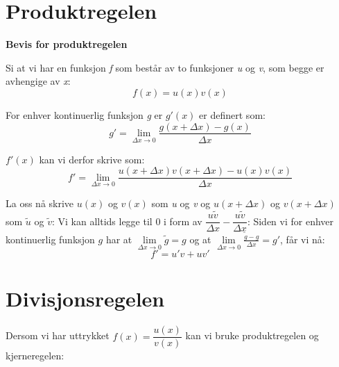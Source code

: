 \section{Produktregelen}
\textbf{Bevis for produktregelen}

Si at vi har en funksjon \textit{f} som består av to funksjoner \textit{u} og \textit{v}, som begge er avhengige av \textit{x}:  
\[ f(x)=u(x)v(x) \] 

For enhver kontinuerlig funksjon \textit{g} er $ g'(x) $ er definert som:
\[ g'= \lim\limits_{\Delta x\to 0}\frac{g(x+\Delta x)-g(x)}{\Delta x} \]

$ f'(x) $ kan vi derfor skrive som:
\[ f'=\lim\limits_{\Delta x\to 0}\frac{u(x+\Delta x)v(x+\Delta x)-u(x)v(x)}{\Delta x} \]

La oss nå skrive $ u(x) $ og $ v(x) $ som \textit{u} og \textit{v} og $ u(x+\Delta x) $ og $ v(x+\Delta x) $ som $ \tilde{u} $ og $ \tilde{v} $:
Vi kan alltids legge til 0 i form av $ \dfrac{u\tilde{v}}{\Delta x}- \dfrac{u\tilde{v}}{\Delta x} $:
Siden vi for enhver kontinuerlig funksjon $ g $ har at $ \lim\limits_{\Delta x\to 0} \tilde{g}=g $ og at $ \lim\limits_{\Delta x\to 0}  \frac{\tilde{g}-g}{\Delta x}=g'$, får vi nå:
\[ f'=u'v+uv' \]	

\section{Divisjonsregelen}
Dersom vi har uttrykket $ f(x)=\dfrac{u(x)}{v(x)} $ kan vi bruke produktregelen og kjerneregelen:


